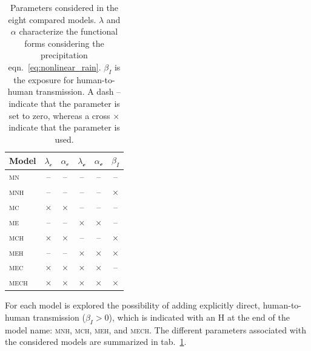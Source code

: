 \begin{table}[h!]
\centering
\begin{tabular}{lccccc}
\toprule
     Model       & $\lambda_{\mathcal{c}}$ & $\alpha_\mathcal{c}$ & $\lambda_{\mathcal{e}}$ & $\alpha_\mathcal{e}$ & $\beta_I$   \\
    \hline
    \textsc{mn} &       --    &    --   &       --      &       --      &  -- \\
    \textsc{mnh} &     --      &   --    &    --         &        --     &   $\times$ \\
    \textsc{mc} &      $\times$  &  $\times$  &     --        &       --      &  -- \\
    \textsc{me} &         --  &   --    &      $\times$    &   $\times$        & --  \\
    \textsc{mch}&      $\times$  &  $\times$  &      --       &     --        &$\times$ \\
    \textsc{meh}&        --   &  --     &      $\times$    &   $\times$        &$\times$ \\
    \textsc{mec}&      $\times$ &  $\times$  &      $\times$    &    $\times$      & --\\
    \textsc{mech}&      $\times$ &  $\times$  &      $\times$    &    $\times$       &   $\times$ \\
\bottomrule
\end{tabular}
\caption[Parameters considered in the eight compared models]{Parameters considered in the eight compared models.  $\lambda$ and $\alpha$ characterize the functional forms considering the precipitation eqn.~\eqref{eq:nonlinear_rain}. $\beta_I$ is the exposure for human-to-human transmission. A dash -- indicate that the parameter is set to zero, whereas a cross $\times$  indicate that the parameter is used.}
\label{tab:models}
\end{table}

 For each model is explored the possibility of adding explicitly direct, human-to-human transmission ($\beta_{I} > 0$), which is indicated with an \textsc{H} at the end of the model name: \textsc{mnh}, \textsc{mch}, \textsc{meh}, and \textsc{mech}. The different parameters associated with the considered models are summarized in tab.~\ref{tab:models}.

